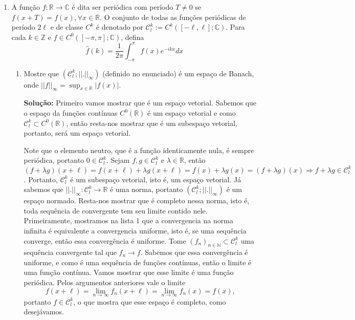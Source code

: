 \documentclass{article}
\begin{document}
\begin{enumerate}
\begin{enumerate}
				
				
				
		\end{enumerate}
		
		
		\item A função $f:\mathbb{R} \to \mathbb{C}$ é dita ser periódica com período $T \neq 0$ se $f(x+T) = f(x), \forall x \in \mathbb{R} $. O conjunto de todas as funções periódicas de período $2\ell$ e de classe $C^{k}$ é denotado por $\mathcal{C}^{k}_{l}:=C^{k}([-\ell, \ell]; \mathbb{C})$. Para cada $k \in \mathbb{Z}$ e $f \in C^{0}([-\pi, \pi]; \mathbb{C})$, defina
		$$
		\hat{f}(k) = \frac{1}{2\pi}\int_{-\pi}^{\pi} f(x)e^{-ikx}dx
		$$
		
		\begin{enumerate}
			\item Mostre que $(\mathcal{C}^{k}_{l}; ||.||_{\infty})$ (definido no enunciado) é um espaço de Banach, onde $||f||_{\infty} = \sup_{x \in \mathbb{R}}|f(x)|$.
			
			\textbf{Solução:} Primeiro vamos mostrar que é um espaço vetorial. Sabemos que o espaço da funções contínuas $C^{0}(\mathbb{R})$ é um espaço vetorial e como $\mathcal{C}^{k}_{l} \subset C^{0}(\mathbb{R})$, então resta-nos mostrar que é um subespaço vetorial, portanto, será um espaço vetorial.
			
			Note que o elemento neutro, que é a função identicamente nula, é sempre periódica, portanto $0 \in \mathcal{C}^{k}_{l}$. Sejam $f, g \in \mathcal{C}^{k}_{l}$ e $\lambda \in \mathbb{R}$, então $(f+\lambda g)(x +\ell) = f(x +\ell)+\lambda g(x +\ell) = f(x)+\lambda g(x)=(f+\lambda g)(x) \Rightarrow f+\lambda g \in  \mathcal{C}^{k}_{l}$. Portanto, $\mathcal{C}^{k}_{l}$ é um subespaço vetorial, isto é, um espaço vetorial. Já sabemos que $||.||_{\infty}:\mathcal{C}^{k}_{l} \to \mathbb{R}$ é uma norma, portanto $(\mathcal{C}^{k}_{l}; ||.||_{\infty})$ é um espaço normado. Resta-nos mostrar que é completo nessa norma, isto é, toda sequência de convergente tem seu limite contido nele. Primeiramente, mostramos na lista 1 que a convergencia na norma infinita é equivalente a convergencia uniforme, isto é, se uma sequência converge, então essa convergência é uniforme. Tome $(f_{n})_{n \in \mathbb{N}} \subset \mathcal{C}^{k}_{l}$ uma sequência convergente tal que $f_{n} \to f$. Sabemos que essa convergência é uniforme, e como é uma sequência de funções contínuas, então o limite é uma função contínua. Vamos mostrar que esse limite é uma função periódica. Pelos argumentos anteriores vale o limite 
			$$
			f(x + \ell) = \lim\limits_{n\to \infty} f_{n}(x + \ell) = \lim\limits_{n\to \infty} f_{n}(x ) = f(x),   
			$$
			portanto $f \in \mathcal{C}^{k}_{l}$, o que mostra que esse espaço é completo, como desejávamos.
			

\end{enumerate}
\end{enumerate}
\end{document}
